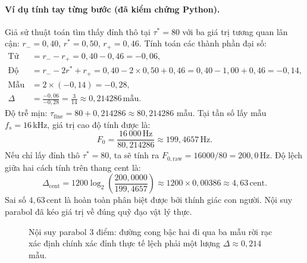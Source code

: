 \paragraph{Ví dụ tính tay từng bước (đã kiểm chứng Python).}
Giả sử thuật toán tìm thấy đỉnh thô tại $\tau^* = 80$ với ba giá trị tương quan lân cận:
$r_{-} = 0{,}40$, $r^* = 0{,}50$, $r_{+} = 0{,}46$.
Tính toán các thành phần đại số:
\begin{align*}
\text{Tử số} &= r_{-} - r_{+} = 0{,}40 - 0{,}46 = -0{,}06,\\[4pt]
\text{Độ cong} &= r_{-} - 2r^* + r_{+} = 0{,}40 - 2 \times 0{,}50 + 0{,}46 = 0{,}40 - 1{,}00 + 0{,}46 = -0{,}14,\\[4pt]
\text{Mẫu số} &= 2 \times (-0{,}14) = -0{,}28,\\[4pt]
\Delta &= \frac{-0{,}06}{-0{,}28} = \frac{3}{14} \approx 0{,}214286\,\text{mẫu}.
\end{align*}
Độ trễ mịn: $\tau_{\mathrm{fine}} = 80 + 0{,}214286 \approx 80{,}214286$ mẫu.
Tại tần số lấy mẫu $f_s = 16\,\text{kHz}$, giá trị cao độ tính được là:
\[
F_0 = \frac{16\,000\,\text{Hz}}{80{,}214286} \approx 199{,}4657\,\text{Hz}.
\]
Nếu chỉ lấy đỉnh thô $\tau^* = 80$, ta sẽ tính ra $F_{0,\mathrm{raw}} = 16000 / 80 = 200{,}0\,\text{Hz}$.
Độ lệch giữa hai cách tính trên thang cent là:
\[
\Delta_{\mathrm{cent}} = 1200 \log_2\left(\frac{200{,}0000}{199{,}4657}\right) \approx 1200 \times 0{,}00386 \approx 4{,}63\,\text{cent}.
\]
Sai số $4{,}63\,\text{cent}$ là hoàn toàn phân biệt được bởi thính giác con người. Nội suy parabol đã kéo giá trị về đúng quỹ đạo vật lý thực.

\begin{figure}[H]
\centering
{}
\caption{Nội suy parabol 3 điểm: đường cong bậc hai đi qua ba mẫu rời rạc xác định chính xác đỉnh thực tế lệch phải một lượng $\Delta \approx 0{,}214$ mẫu.}
\label{fig:ch01_parabolic}
\end{figure}

